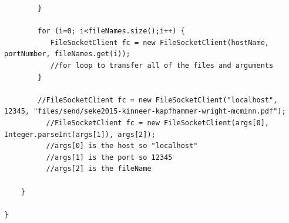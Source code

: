 \documentclass{article}
\begin{document}
\begin{lstlisting}
        }

        for (i=0; i<fileNames.size();i++) {
           FileSocketClient fc = new FileSocketClient(hostName, portNumber, fileNames.get(i)); 
           //for loop to transfer all of the files and arguments          
        }

        //FileSocketClient fc = new FileSocketClient("localhost", 12345, "files/send/seke2015-kinneer-kapfhammer-wright-mcminn.pdf");
          //FileSocketClient fc = new FileSocketClient(args[0], Integer.parseInt(args[1]), args[2]);
          //args[0] is the host so "localhost"
          //args[1] is the port so 12345
          //args[2] is the fileName

    }

}

\end{lstlisting}
\end{document}
